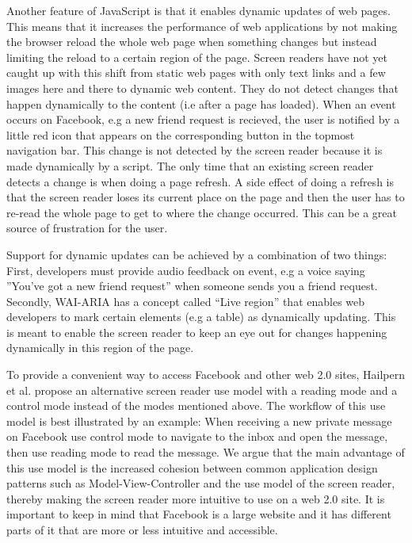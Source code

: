 \documentclass[conference]{IEEEtran}
\begin{document}
Another feature of JavaScript is that it  enables dynamic updates of web pages.
This means that it increases the performance of web applications by not making
the browser reload the whole web page when something changes but instead
limiting the reload to a certain region of the page. Screen readers have not
yet caught up with this shift from static web pages with only text links and a
few images here and there to dynamic web content. They do not detect changes
that happen dynamically to the content (i.e after a page has
loaded)\cite{hailpern2009}.  When an event occurs on Facebook, e.g a new friend
request is recieved, the user is notified by a little red icon that appears on
the corresponding button in the topmost navigation bar.  This change is not
detected by the screen reader\cite{buzzi2010} because it is made dynamically by
a script.  The only time that an existing screen reader detects a change is
when doing a page refresh. A side effect of doing a refresh is that the screen
reader loses its current place on the page and then the user has to re-read the
whole page to get to where the change occurred. This can be a great source of
frustration for the user.\cite{petrie2004} 

Support for dynamic updates can be achieved by a combination of two
things\cite{hailpern2009}: First, developers must provide audio feedback on
event, e.g a voice saying ''You've got a new friend request'' when someone
sends you a friend request. Secondly, WAI-ARIA has a concept called ``Live
region''\cite{ariaspec} that enables web developers to mark certain elements
(e.g a table) as dynamically updating. This is meant to enable the screen
reader to keep an eye out for changes happening dynamically in this region of
the page.

To provide a convenient way to access Facebook and other web 2.0 sites,
Hailpern et al\cite{hailpern2009}.  propose an alternative screen reader use
model with a reading mode and a control mode instead of the modes mentioned
above. The workflow of this use model is best illustrated by an example: When
receiving a new private message on Facebook use control mode to navigate to the
inbox and open the message, then use reading mode to read the message.  We
argue that the main advantage of this use model is the increased cohesion
between common application design patterns such as Model-View-Controller and
the use model of the screen reader, thereby making the screen reader more
intuitive to use on a web 2.0 site. It is important to keep in mind that
Facebook is a large website and it has different parts of it that are more or
less intuitive and accessible.
\end{document}
